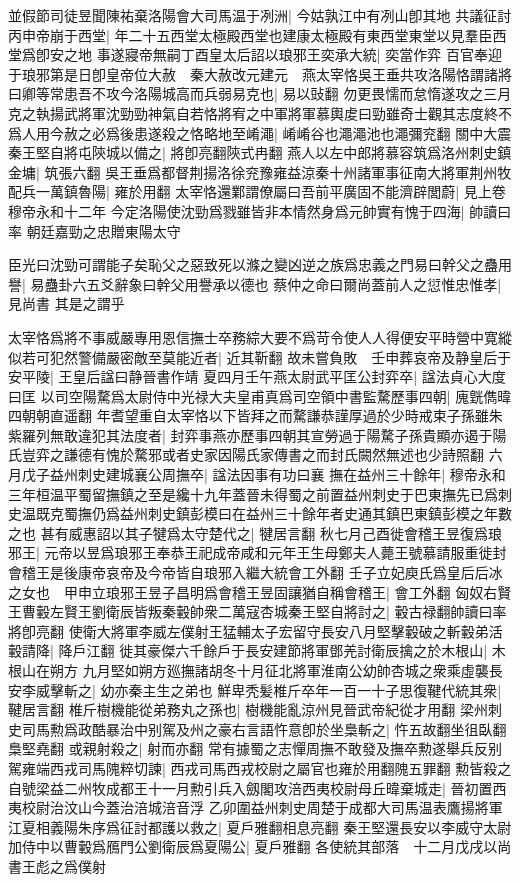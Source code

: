 並假節司徒昱聞陳祐棄洛陽會大司馬温于冽洲|{
	今姑孰江中有冽山卽其地}
共議征討丙申帝崩于西堂|{
	年二十五西堂太極殿西堂也建康太極殿有東西堂東堂以見羣臣西堂爲卽安之地}
事遂寢帝無嗣丁酉皇太后詔以琅邪王奕承大統|{
	奕當作弈}
百官奉迎于琅邪第是日卽皇帝位大赦　秦大赦改元建元　燕太宰恪吳王垂共攻洛陽恪謂諸將曰卿等常患吾不攻今洛陽城高而兵弱易克也|{
	易以䜴翻}
勿更畏懦而怠惰遂攻之三月克之執揚武將軍沈勁勁神氣自若恪將宥之中軍將軍慕輿䖍曰勁雖奇士觀其志度終不爲人用今赦之必爲後患遂殺之恪略地至崤澠|{
	崤崤谷也澠澠池也澠彌兖翻}
關中大震秦王堅自將屯陝城以備之|{
	將卽亮翻陝式冉翻}
燕人以左中郎將慕容筑爲洛州刺史鎮金墉|{
	筑張六翻}
吳王垂爲都督荆揚洛徐兖豫雍益涼秦十州諸軍事征南大將軍荆州牧配兵一萬鎮魯陽|{
	雍於用翻}
太宰恪還鄴謂僚屬曰吾前平廣固不能濟辟閭蔚|{
	見上卷穆帝永和十二年}
今定洛陽使沈勁爲戮雖皆非本情然身爲元帥實有愧于四海|{
	帥讀曰率}
朝廷嘉勁之忠贈東陽太守

臣光曰沈勁可謂能子矣恥父之惡致死以滌之變凶逆之族爲忠義之門易曰幹父之蠱用譽|{
	易蠱卦六五爻辭象曰幹父用譽承以德也}
蔡仲之命曰爾尚蓋前人之愆惟忠惟孝|{
	見尚書}
其是之謂乎

太宰恪爲將不事威嚴專用恩信撫士卒務綜大要不爲苛令使人人得便安平時營中寛縱似若可犯然警備嚴密敵至莫能近者|{
	近其靳翻}
故未嘗負敗　壬申葬哀帝及静皇后于安平陵|{
	王皇后諡曰静晉書作靖}
夏四月壬午燕太尉武平匡公封弈卒|{
	諡法貞心大度曰匡}
以司空陽騖爲太尉侍中光禄大夫皇甫真爲司空領中書監騖歷事四朝|{
	廆皝儁暐四朝朝直遥翻}
年耆望重自太宰恪以下皆拜之而騖謙恭謹厚過於少時戒束子孫雖朱紫羅列無敢違犯其法度者|{
	封弈事燕亦歷事四朝其宣勞過于陽騖子孫貴顯亦遏于陽氏豈弈之謙德有愧於騖邪或者史家因陽氏家傳書之而封氏闕然無述也少詩照翻}
六月戊子益州刺史建城襄公周撫卒|{
	諡法因事有功曰襄}
撫在益州三十餘年|{
	穆帝永和三年桓温平蜀留撫鎮之至是纔十九年蓋晉未得蜀之前置益州刺史于巴東撫先已爲刺史温既克蜀撫仍爲益州刺史鎮彭模曰在益州三十餘年者史通其鎮巴東鎮彭模之年數之也}
甚有威惠詔以其子犍爲太守楚代之|{
	犍居言翻}
秋七月己酉徙會稽王昱復爲琅邪王|{
	元帝以昱爲琅邪王奉恭王祀成帝咸和元年王生母鄭夫人薨王號慕請服重徙封會稽王是後康帝哀帝及今帝皆自琅邪入繼大統會工外翻}
壬子立妃庾氏爲皇后后冰之女也　甲申立琅邪王昱子昌明爲會稽王昱固讓猶自稱會稽王|{
	會工外翻}
匈奴右賢王曹轂左賢王劉衛辰皆叛秦轂帥衆二萬寇杏城秦王堅自將討之|{
	轂古禄翻帥讀曰率將卽亮翻}
使衛大將軍李威左僕射王猛輔太子宏留守長安八月堅擊轂破之斬轂弟活轂請降|{
	降戶江翻}
徙其豪傑六千餘戶于長安建節將軍鄧羌討衛辰擒之於木根山|{
	木根山在朔方}
九月堅如朔方廵撫諸胡冬十月征北將軍淮南公幼帥杏城之衆乘虛襲長安李威擊斬之|{
	幼亦秦主生之弟也}
鮮卑秃髪椎斤卒年一百一十子思復鞬代統其衆|{
	鞬居言翻}
椎斤樹機能從弟務丸之孫也|{
	樹機能亂涼州見晉武帝紀從才用翻}
梁州刺史司馬勲爲政酷暴治中别駕及州之豪右言語忤意卽於坐梟斬之|{
	忤五故翻坐徂臥翻梟堅堯翻}
或親射殺之|{
	射而亦翻}
常有據蜀之志憚周撫不敢發及撫卒勲遂舉兵反别駕雍端西戎司馬隗粹切諫|{
	西戎司馬西戎校尉之屬官也雍於用翻隗五罪翻}
勲皆殺之自號梁益二州牧成都王十一月勲引兵入劔閣攻涪西夷校尉母丘暐棄城走|{
	晉初置西夷校尉治汶山今蓋治涪城涪音浮}
乙卯圍益州刺史周楚于成都大司馬温表鷹揚將軍江夏相義陽朱序爲征討都護以救之|{
	夏戶雅翻相息亮翻}
秦王堅還長安以李威守太尉加侍中以曹轂爲鴈門公劉衛辰爲夏陽公|{
	夏戶雅翻}
各使統其部落　十二月戊戌以尚書王彪之爲僕射

